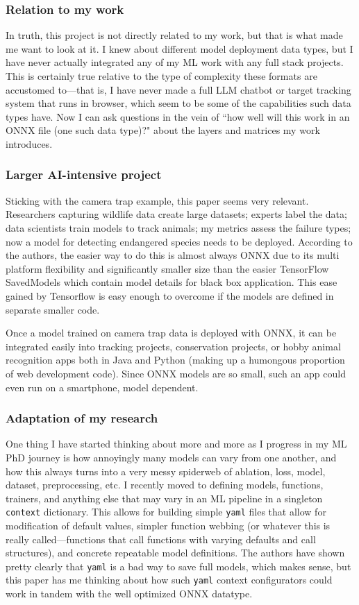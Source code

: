 \documentclass{article}
\begin{document}
\subsubsection{Relation to my work}

In truth, this project is not directly related to my work, but that is what made me want to look at it. I knew about different model deployment data types, but I have never actually integrated any of my ML work with any full stack projects. 
This is certainly true relative to the type of complexity these formats are accustomed to—that is, I have never made a full LLM chatbot or target tracking system that runs in browser, which seem to be some of the capabilities such data types have.
Now I can ask questions  in the vein of ``how well will this work in an ONNX file (one such data type)?" about the layers and matrices my work introduces.


\subsubsection{Larger AI-intensive project}
Sticking with the camera trap example, this paper seems very relevant. 
Researchers capturing wildlife data create large datasets; experts label the data; data scientists train models to track animals; my metrics assess the failure types; now a model for detecting endangered species needs to be deployed.
According to the authors, the easier way to do this is almost always ONNX due to its multi platform flexibility and significantly smaller size than the easier TensorFlow SavedModels which contain model details for black box application.
This ease gained by Tensorflow is easy enough to overcome if the models are defined in separate smaller code.

Once a model trained on camera trap data is deployed with ONNX, it can be integrated easily into tracking projects, conservation projects, or hobby animal recognition apps both in Java and Python (making up a humongous proportion of web development code).
Since ONNX models are so small, such an app could even run on a smartphone, model dependent.

\subsubsection{Adaptation of my research}
One thing I have started thinking about more and more as I progress in my ML PhD journey is how annoyingly many models can vary from one another, and how this always turns into a very messy spiderweb of ablation, loss, model, dataset, preprocessing, etc.
I recently moved to defining models, functions, trainers, and anything else that may vary in an ML pipeline in a singleton \texttt{context} dictionary. 
This allows for building simple \texttt{yaml} files that allow for modification of default values, simpler function webbing (or whatever this is really called—functions that call functions with varying defaults and call structures), and concrete repeatable model definitions. 
The authors have shown pretty clearly that \texttt{yaml} is a bad way to save full models, which makes sense, but this paper has me thinking about how such \texttt{yaml} context configurators could work in tandem with the well optimized ONNX datatype. 
\end{document}
